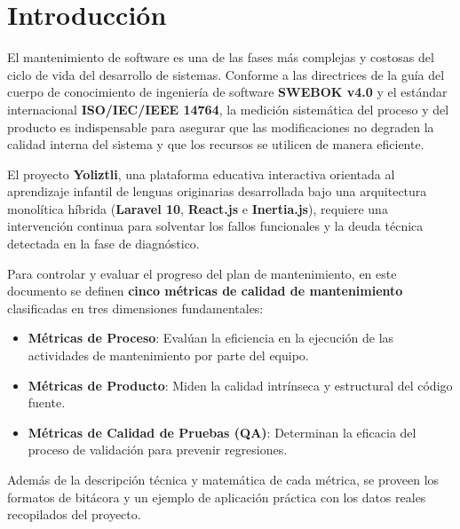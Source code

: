 \documentclass[12pt]{article}
\begin{document}


\newpage
{
\hypersetup{linkcolor=black}
\tableofcontents
}
\newpage

\section{Introducción}

El mantenimiento de software es una de las fases más complejas y costosas del ciclo de vida del desarrollo de sistemas. Conforme a las directrices de la guía del cuerpo de conocimiento de ingeniería de software \textbf{SWEBOK v4.0} y el estándar internacional \textbf{ISO/IEC/IEEE 14764}, la medición sistemática del proceso y del producto es indispensable para asegurar que las modificaciones no degraden la calidad interna del sistema y que los recursos se utilicen de manera eficiente.

El proyecto \textbf{Yoliztli}, una plataforma educativa interactiva orientada al aprendizaje infantil de lenguas originarias desarrollada bajo una arquitectura monolítica híbrida (\textbf{Laravel 10}, \textbf{React.js} e \textbf{Inertia.js}), requiere una intervención continua para solventar los fallos funcionales y la deuda técnica detectada en la fase de diagnóstico. 

Para controlar y evaluar el progreso del plan de mantenimiento, en este documento se definen \textbf{cinco métricas de calidad de mantenimiento} clasificadas en tres dimensiones fundamentales:
\begin{itemize}
    \item \textbf{Métricas de Proceso}: Evalúan la eficiencia en la ejecución de las actividades de mantenimiento por parte del equipo.
    \item \textbf{Métricas de Producto}: Miden la calidad intrínseca y estructural del código fuente.
    \item \textbf{Métricas de Calidad de Pruebas (QA)}: Determinan la eficacia del proceso de validación para prevenir regresiones.
\end{itemize}

Además de la descripción técnica y matemática de cada métrica, se proveen los formatos de bitácora y un ejemplo de aplicación práctica con los datos reales recopilados del proyecto.

\newpage

\end{document}
